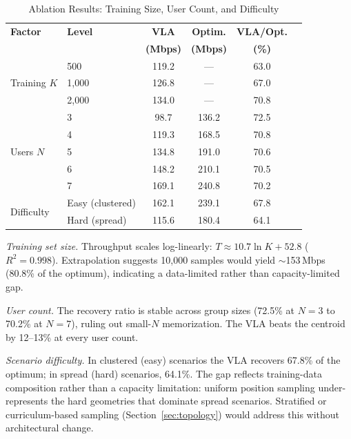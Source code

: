 \documentclass[journal]{IEEEtran}
\begin{document}
\begin{table}[!t]
    \centering
    \caption{Ablation Results: Training Size, User Count, and Difficulty}
    \label{tab:ablation}
    \footnotesize
    \begin{tabular}{@{}llcccc@{}}
        \toprule
        \textbf{Factor} & \textbf{Level} & \textbf{VLA} & \textbf{Optim.} & \textbf{VLA/Opt.} \\
         & & \textbf{(Mbps)} & \textbf{(Mbps)} & \textbf{(\%)} \\
        \midrule
        \multirow{3}{*}{Training $K$} & 500 & 119.2 & --- & 63.0 \\
         & 1{,}000 & 126.8 & --- & 67.0 \\
         & 2{,}000 & 134.0 & --- & 70.8 \\
        \midrule
        \multirow{5}{*}{Users $N$} & 3 & 98.7 & 136.2 & 72.5 \\
         & 4 & 119.3 & 168.5 & 70.8 \\
         & 5 & 134.8 & 191.0 & 70.6 \\
         & 6 & 148.2 & 210.1 & 70.5 \\
         & 7 & 169.1 & 240.8 & 70.2 \\
        \midrule
        \multirow{2}{*}{Difficulty} & Easy (clustered) & 162.1 & 239.1 & 67.8 \\
         & Hard (spread) & 115.6 & 180.4 & 64.1 \\
        \bottomrule
    \end{tabular}
\end{table}

\emph{Training set size.} Throughput scales log-linearly: $T \approx 10.7 \ln K + 52.8$ ($R^2{=}0.998$). Extrapolation suggests 10{,}000 samples would yield ${\sim}$153\,Mbps (80.8\% of the optimum), indicating a data-limited rather than capacity-limited gap.

\emph{User count.} The recovery ratio is stable across group sizes (72.5\% at $N{=}3$ to 70.2\% at $N{=}7$), ruling out small-$N$ memorization. The VLA beats the centroid by 12--13\% at every user count.

\emph{Scenario difficulty.} In clustered (easy) scenarios the VLA recovers 67.8\% of the optimum; in spread (hard) scenarios, 64.1\%. The gap reflects training-data composition rather than a capacity limitation: uniform position sampling under-represents the hard geometries that dominate spread scenarios. Stratified or curriculum-based sampling (Section~\ref{sec:topology}) would address this without architectural change.
\end{document}
